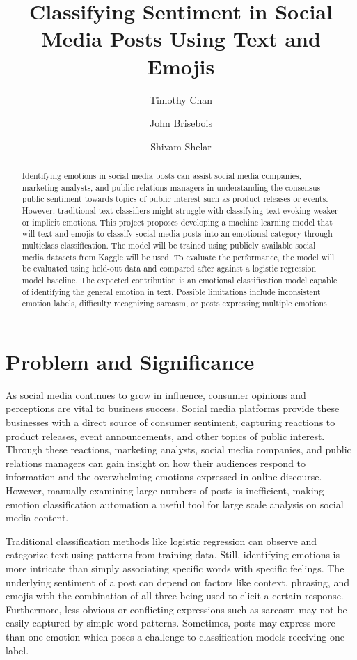 \documentclass[sigconf,nonacm]{acmart}
\title{Classifying Sentiment in Social Media Posts Using Text and Emojis}
\author{Timothy Chan}
\affiliation{%
  \institution{San Jose State University}
  \city{San Jose}
  \state{California}
  \country{USA}}
\author{John Brisebois}
\affiliation{%
  \institution{San Jose State University}
  \city{San Jose}
  \state{California}
  \country{USA}}
\author{Shivam Shelar}
\affiliation{%
  \institution{San Jose State University}
  \city{San Jose}
  \state{California}
  \country{USA}}
\begin{document}
\begin{abstract}
Identifying emotions in social media posts can assist social media companies, marketing analysts, and public relations managers in understanding the consensus public sentiment towards topics of public interest such as product releases or events. However, traditional text classifiers might struggle with classifying text evoking weaker or implicit emotions. This project proposes developing a machine learning model that will text and emojis to classify social media posts into an emotional category through multiclass classification. The model will be trained using publicly available social media datasets from Kaggle will be used. To evaluate the performance, the model will be evaluated using held-out data and compared after against a logistic regression model baseline. The expected contribution is an emotional classification model capable of identifying the general emotion in text. Possible limitations include inconsistent emotion labels, difficulty recognizing sarcasm, or posts expressing multiple emotions. 
\end{abstract}


\maketitle

\section{Problem and Significance}
As social media continues to grow in influence, consumer opinions and perceptions are vital to business success. Social media platforms provide these businesses with a direct source of consumer sentiment, capturing reactions to product releases, event announcements, and other topics of public interest. Through these reactions, marketing analysts, social media companies, and public relations managers can gain insight on how their audiences respond to information and the overwhelming emotions expressed in online discourse. However, manually examining large numbers of posts is inefficient, making emotion classification automation a useful tool for large scale analysis on social media content.

Traditional classification methods like logistic regression can observe and categorize text using patterns from training data. Still, identifying emotions is more intricate than simply associating specific words with specific feelings. The underlying sentiment of a post can depend on factors like context, phrasing, and emojis with the combination of all three being used to elicit a certain response. Furthermore, less obvious or conflicting expressions such as sarcasm may not be easily captured by simple word patterns. Sometimes, posts may express more than one emotion which poses a challenge to classification models receiving one label. 
\end{document}
